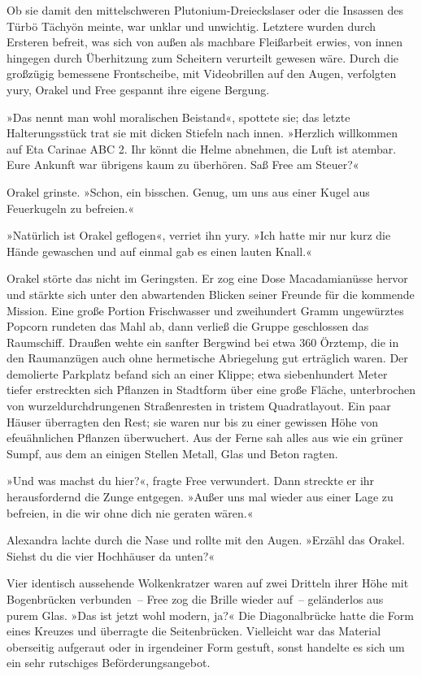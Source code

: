 Ob sie damit den mittelschweren Plutonium-Dreieckslaser oder die Insassen des Türbö Tächyön meinte, war unklar und unwichtig. Letztere wurden durch Ersteren befreit, was sich von außen als machbare Fleißarbeit erwies, von innen hingegen durch Überhitzung zum Scheitern verurteilt gewesen wäre. Durch die großzügig bemessene Frontscheibe, mit Videobrillen auf den Augen, verfolgten yury, Orakel und Free gespannt ihre eigene Bergung.

»Das nennt man wohl moralischen Beistand«, spottete sie; das letzte Halterungsstück trat sie mit dicken Stiefeln nach innen. »Herzlich willkommen auf Eta Carinae ABC 2. Ihr könnt die Helme abnehmen, die Luft ist atembar. Eure Ankunft war übrigens kaum zu überhören. Saß Free am Steuer?«

Orakel grinste. »Schon, ein bisschen. Genug, um uns aus einer Kugel aus Feuerkugeln zu befreien.«

»Natürlich ist Orakel geflogen«, verriet ihn yury. »Ich hatte mir nur kurz die Hände gewaschen und auf einmal gab es einen lauten Knall.«

Orakel störte das nicht im Geringsten. Er zog eine Dose Macadamianüsse hervor und stärkte sich unter den abwartenden Blicken seiner Freunde für die kommende Mission. Eine große Portion Frischwasser und zweihundert Gramm ungewürztes Popcorn rundeten das Mahl ab, dann verließ die Gruppe geschlossen das Raumschiff. Draußen wehte ein sanfter Bergwind bei etwa 360 Örztemp, die in den Raumanzügen auch ohne hermetische Abriegelung gut erträglich waren. Der demolierte Parkplatz befand sich an einer Klippe; etwa siebenhundert Meter tiefer erstreckten sich Pflanzen in Stadtform über eine große Fläche, unterbrochen von wurzeldurchdrungenen Straßenresten in tristem Quadratlayout. Ein paar Häuser überragten den Rest; sie waren nur bis zu einer gewissen Höhe von efeuähnlichen Pflanzen überwuchert. Aus der Ferne sah alles aus wie ein grüner Sumpf, aus dem an einigen Stellen Metall, Glas und Beton ragten.

»Und was machst du hier?«, fragte Free verwundert. Dann streckte er ihr herausfordernd die Zunge entgegen. »Außer uns mal wieder aus einer Lage zu befreien, in die wir ohne dich nie geraten wären.«

Alexandra lachte durch die Nase und rollte mit den Augen. »Erzähl das Orakel. Siehst du die vier Hochhäuser da unten?«

Vier identisch aussehende Wolkenkratzer waren auf zwei Dritteln ihrer Höhe mit Bogenbrücken verbunden~– Free zog die Brille wieder auf~– geländerlos aus purem Glas. »Das ist jetzt wohl modern, ja?« Die Diagonalbrücke hatte die Form eines Kreuzes und überragte die Seitenbrücken. Vielleicht war das Material oberseitig aufgeraut oder in irgendeiner Form gestuft, sonst handelte es sich um ein sehr rutschiges Beförderungsangebot.

